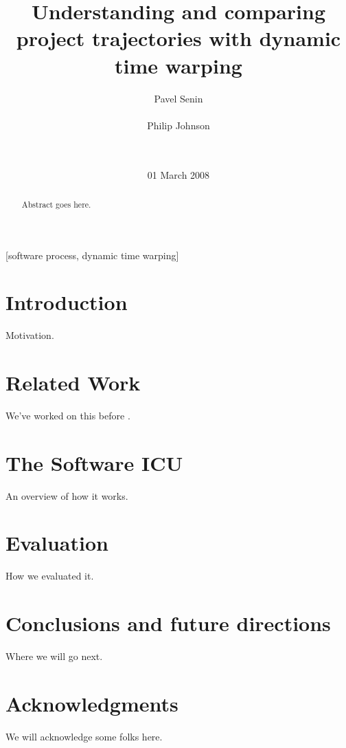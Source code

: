 \documentclass{acm_proc_article-sp}
\begin{document}
\title{Understanding and comparing project trajectories with dynamic time warping}


\author{
  \alignauthor Pavel Senin \\
  \\
%
  \alignauthor Philip Johnson\\
  \\
  \\
}

\date{01 March 2008}

\maketitle
\begin{abstract}
Abstract goes here.
\end{abstract}

[software process, dynamic time warping]

\section{Introduction}

Motivation.

\section {Related Work}

We've worked on this before \cite{csdl2-07-02,csdl2-03-12,csdl2-03-13}.

\section{The Software ICU}

An overview of how it works.  

\section{Evaluation}

How we evaluated it.

\section{Conclusions and future directions}

Where we will go next.

\section{Acknowledgments}

We will acknowledge some folks here.


  
\end{document}
